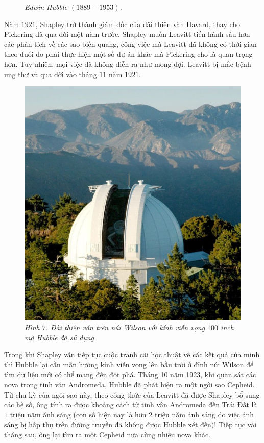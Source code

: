 \begin{multicols}{2}
\begin{figure}[H]
		\caption{\small\textit{\color{timhieukhoahoc}Edwin Hubble $(1889 - 1953)$.}}
		\vspace*{-10pt}
	\end{figure}
	Năm $1921$, Shapley trở thành giám đốc của đâì thiên văn Havard, thay cho Pickering đã qua đời một năm trước. Shapley muốn Leavitt tiến hành sâu hơn các phân tích về các sao biến quang, công việc mà Leavitt đã không có thời gian theo đuổi do phải thực hiện một số dự án khác mà Pickering cho là quan trọng hơn. Tuy nhiên, mọi việc đã không diễn ra như mong đợi. Leavitt bị mắc bệnh ung thư và qua đời vào tháng $11$ năm $1921$.
	\begin{figure}[H]
		\vspace*{-5pt}
		\centering
		\captionsetup{labelformat= empty, justification=centering}
		\includegraphics[width= 1\linewidth]{10}
		\caption{\small\textit{\color{timhieukhoahoc}Hình $7$. Đài thiên văn trên núi Wilson với kính viễn vọng $100$ inch mà Hubble đã sử dụng.}}
		\vspace*{-10pt}
	\end{figure}
	Trong khi Shapley vẫn tiếp tục cuộc tranh cãi học thuật về các kết quả của mình thì Hubble lại cần mẫn hướng kính viễn vọng lên bầu trời ở đỉnh núi Wilson để tìm dữ liệu mới có thể mang đến đột phá. Tháng 10 năm 1923, khi quan sát các nova trong tinh vân Andromeda, Hubble đã phát hiện ra một ngôi sao Cepheid. Từ chu kỳ của ngôi sao này, theo công thức của Leavitt đã được Shapley bổ sung các hệ số, ông tính ra được khoảng cách từ tinh vân Andromeda đến Trái Đất là $1$ triệu năm ánh sáng (con số hiện nay là hơn $2$ triệu năm ánh sáng do việc ánh sáng bị hấp thụ trên đường truyền đã không được Hubble xét đến)!  Tiếp tục vài tháng sau, ông lại tìm ra một Cepheid nữa cùng nhiều nova khác.

\end{multicols}
